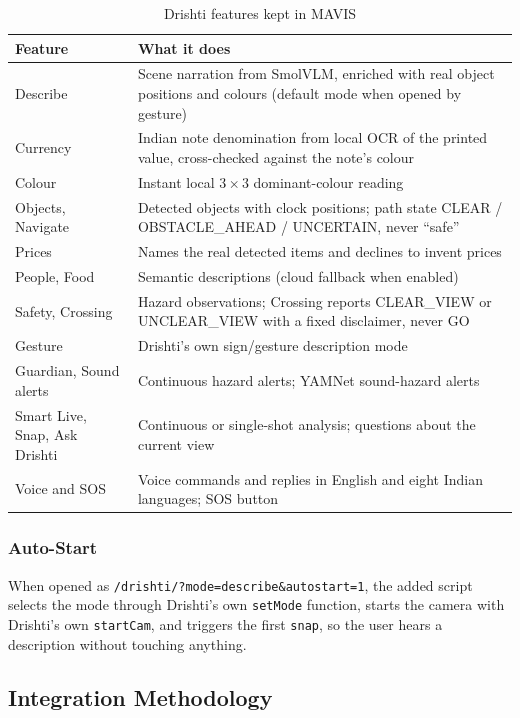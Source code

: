 \documentclass[12pt,singleside,a4paper]{article}
\begin{document}
\begin{table}[H]
\centering
\caption{Drishti features kept in MAVIS}
\label{tab:drfeat}
\small
\begin{tabularx}{\textwidth}{@{}p{3.4cm}X@{}}
\toprule
\textbf{Feature} & \textbf{What it does} \\
\midrule
Describe & Scene narration from SmolVLM, enriched with real object positions and colours (default mode when opened by gesture) \\
Currency & Indian note denomination from local OCR of the printed value, cross-checked against the note's colour \\
Colour & Instant local $3\times3$ dominant-colour reading \\
Objects, Navigate & Detected objects with clock positions; path state CLEAR / OBSTACLE\_AHEAD / UNCERTAIN, never ``safe'' \\
Prices & Names the real detected items and declines to invent prices \\
People, Food & Semantic descriptions (cloud fallback when enabled) \\
Safety, Crossing & Hazard observations; Crossing reports CLEAR\_VIEW or UNCLEAR\_VIEW with a fixed disclaimer, never GO \\
Gesture & Drishti's own sign/gesture description mode \\
Guardian, Sound alerts & Continuous hazard alerts; YAMNet sound-hazard alerts \\
Smart Live, Snap, Ask Drishti & Continuous or single-shot analysis; questions about the current view \\
Voice and SOS & Voice commands and replies in English and eight Indian languages; SOS button \\
\bottomrule
\end{tabularx}
\end{table}

\subsubsection{Auto-Start}
When opened as \texttt{/drishti/?mode=describe\&autostart=1}, the added script selects the mode through Drishti's own \texttt{setMode} function, starts the camera with Drishti's own \texttt{startCam}, and triggers the first \texttt{snap}, so the user hears a description without touching anything.

\subsection{Integration Methodology}
\end{document}
